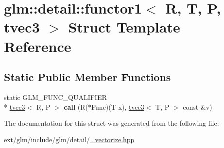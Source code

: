 \hypertarget{structglm_1_1detail_1_1functor1_3_01_r_00_01_t_00_01_p_00_01tvec3_01_4}{\section{glm\-:\-:detail\-:\-:functor1$<$ R, T, P, tvec3 $>$ Struct Template Reference}
\label{structglm_1_1detail_1_1functor1_3_01_r_00_01_t_00_01_p_00_01tvec3_01_4}
}
\subsection*{Static Public Member Functions}
\begin{DoxyCompactItemize}
\item 
\hypertarget{structglm_1_1detail_1_1functor1_3_01_r_00_01_t_00_01_p_00_01tvec3_01_4_a8ae374d9111e3de3d32f18762f1918cc}{static G\-L\-M\-\_\-\-F\-U\-N\-C\-\_\-\-Q\-U\-A\-L\-I\-F\-I\-E\-R \\*
\hyperlink{structglm_1_1tvec3}{tvec3}$<$ R, P $>$ {\bfseries call} (R($\ast$Func)(T x), \hyperlink{structglm_1_1tvec3}{tvec3}$<$ T, P $>$ const \&v)}\label{structglm_1_1detail_1_1functor1_3_01_r_00_01_t_00_01_p_00_01tvec3_01_4_a8ae374d9111e3de3d32f18762f1918cc}

\end{DoxyCompactItemize}


The documentation for this struct was generated from the following file\-:\begin{DoxyCompactItemize}
\item 
ext/glm/include/glm/detail/\hyperlink{__vectorize_8hpp}{\-\_\-vectorize.\-hpp}\end{DoxyCompactItemize}
